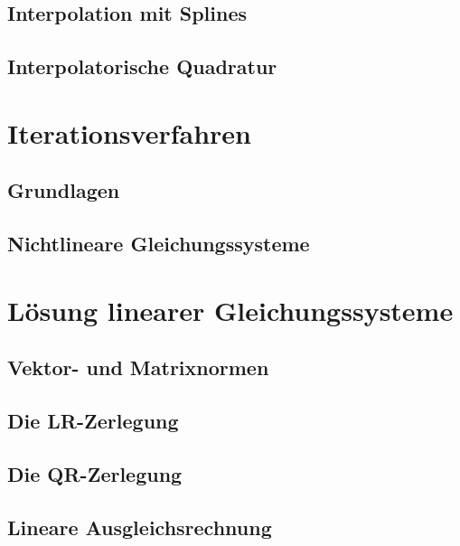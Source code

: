 \section{Interpolation mit Splines}


%

\section{Interpolatorische Quadratur}


\chapter{Iterationsverfahren}

\section{Grundlagen}


\section{Nichtlineare Gleichungssysteme}


%


\chapter{Lösung linearer Gleichungssysteme}

\section{Vektor- und Matrixnormen}


\section{Die LR-Zerlegung}


\section{Die QR-Zerlegung}


\section{Lineare Ausgleichsrechnung}




\printindex

